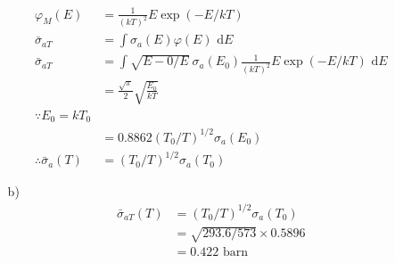 \documentclass{article}
\begin{document}
\begin{itemize}
\begin{itemize}
        \begin{align*}
            \varphi_M(E)&=\frac{1}{(kT)^2}E\exp(-E/kT)\\
            \bar{\sigma}_{aT}&=\int \sigma_a(E)\varphi(E)\text{ d}E\\
            \bar{\sigma}_{aT}&=\int \sqrt{E-0/E}\ \sigma_a(E_0)\frac{1}{(kT)^2}E\exp(-E/kT)\text{ d}E\\
            &=\frac{\sqrt{\pi}}{2}\sqrt{\frac{E_0}{kT}}\\
            \because E_0 = kT_0\\
            &=0.8862(T_0/T)^{1/2}\sigma_a(E_0)\\
            \therefore \bar{\sigma}_a(T)&=(T_0/T)^{1/2}\sigma_a(T_0)
        \end{align*}
        \item [b)]
        \begin{align*}
            \bar{\sigma}_{aT}(T)&=(T_0/T)^{1/2}\sigma_a(T_0)\\
            &=\sqrt{293.6/573}\times0.5896\\
            &= 0.422\text{ barn}
        \end{align*}
    \end{itemize}
\end{itemize}
\end{document}
